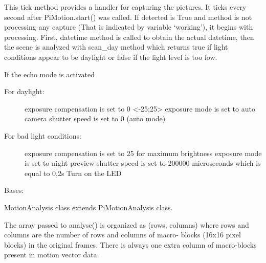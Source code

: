 \documentclass[letterpaper,10pt,english]{sphinxmanual}
\begin{document}
\begin{fulllineitems}

\begin{fulllineitems}
\label{rpicameramon:rpicameramon.motion.CaptureHandler.tick}
This tick method provides a handler for capturing the pictures.
It ticks every second after PiMotion.start() was called.
If detected is True and method is not processing any capture
(That is indicated by variable `working'), it begins with processing.
First, datetime method is called to obtain the actual datetime, then
the scene is analyzed with scan\_day method which returns true if
light conditions appear to be daylight or false if the light level
is too low.

If the echo mode is activated
\begin{description}
\item[{For daylight:}] \leavevmode
exposure compensation is set to 0 \textless{}-25;25\textgreater{}
exposure mode is set to auto
camera shutter speed is set to 0 (auto mode)

\item[{For bad light conditions:}] \leavevmode
exposure compensation is set to 25 for maximum brightness
exposure mode is set to night preview
shutter speed is set to 200000 microseconds which is equal
to 0,2s
Turn on the LED

\end{description}

\end{fulllineitems}


\end{fulllineitems}


\begin{fulllineitems}
\label{rpicameramon:rpicameramon.motion.MotionAnalysis}
Bases: 

MotionAnalysis class extends PiMotionAnalysis class.

The array passed to analyse() is organized as (rows, columns)
where rows and columns are the number of rows and columns of macro-
blocks (16x16 pixel blocks) in the original frames. There is always
one extra column of macro-blocks present in motion vector data.

\begin{fulllineitems}
\label{rpicameramon:rpicameramon.motion.MotionAnalysis.analyse}
\end{fulllineitems}


\end{fulllineitems}
\end{document}
